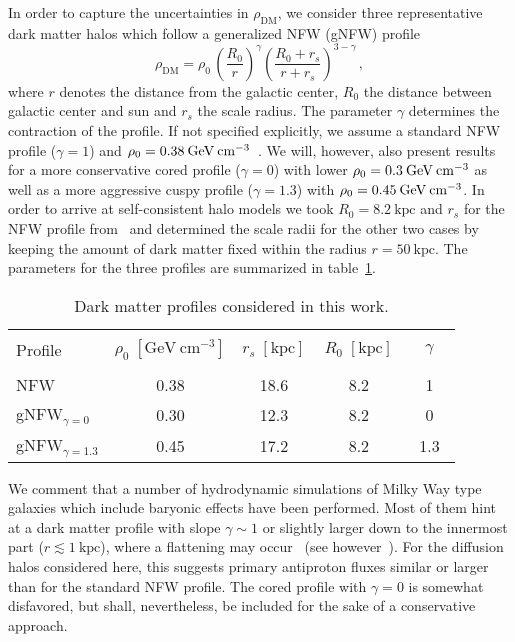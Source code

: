 \documentclass[a4paper,11pt]{article}
\newcommand{\eVdist}{\kern-0.06em}
\newcommand{\gev}{\:\text{Ge\eVdist V}}
\newcommand{\kpc}{\:\text{kpc}}
\newcommand{\cm}{\:\text{cm}}
\begin{document}
In order to capture the uncertainties in $\rho_{\text{DM}}$, we consider three representative dark matter halos which follow a generalized NFW (gNFW) profile
\begin{equation}
  \rho_{\text{DM}} = \rho_0\, \left(\frac{R_0}{r}\right)^\gamma \left(\frac{R_0 +r_s}{r+r_s}\right)^{3-\gamma}\,,
\end{equation}
where $r$ denotes the distance from the galactic center, $R_0$ the distance between galactic center and sun and $r_s$ the scale radius. The parameter $\gamma$ determines the contraction of the profile. 
If not specified explicitly, we assume a standard NFW profile ($\gamma=1$) and $\rho_0=0.38\gev\cm^{-3}$~\cite{McMillan:2016}. We will, however, also present results for a more conservative cored profile ($\gamma=0$) with lower $\rho_0=0.3\gev\cm^{-3}$ as well as a more aggressive cuspy profile ($\gamma=1.3$) with $\rho_0=0.45\gev\cm^{-3}$. In order to arrive at self-consistent halo models we took $R_0=8.2\kpc$ and $r_s$ for the NFW profile from~\cite{McMillan:2016} and determined the scale radii for the other two cases by keeping the amount of dark matter fixed within the radius $r=50\kpc$. The parameters for the three profiles are summarized in table~\ref{tab:profiles}.

\begin{table}[htp]
\begin{center}
\begin{tabular}{|l|cccc|}
\hline
\rowcolor{light-gray}  &   &  &&   \\[-3mm]
\rowcolor{light-gray}  Profile & $\rho_0\;[\text{GeV}\cm^{-3}]$ & $r_s\;[\text{kpc}]$ & $\,R_0\;[\text{kpc}]\,$ & $\;\;\;\gamma\;\;\;$  \\[2mm]
\hline 
  &   & && \\[-3mm]
NFW & 0.38 & 18.6 & 8.2& 1  \\[2mm]
gNFW$_{\gamma=0}$ & 0.30 & 12.3 & 8.2 & 0  \\[2mm]
gNFW$_{\gamma=1.3}$ & 0.45 & 17.2 & 8.2 & 1.3  \\[2mm]
 \hline
\end{tabular}
\end{center}
\caption{Dark matter profiles considered in this work.}
\label{tab:profiles}
\end{table}

We comment that a number of hydrodynamic simulations of Milky Way type galaxies which include baryonic effects have been performed. Most of them hint at a dark matter profile with slope $\gamma \sim 1$ or slightly larger down to the innermost part ($r\lesssim 1\kpc$), where a flattening may occur~\cite{Guedes:2011ux,Roca-Fabrega:2015gma,Zhu:2015jwa,Schaller:2015mua} (see however~\cite{Mollitor:2014ara}). For the diffusion halos considered here, this suggests primary antiproton fluxes similar or larger than for the standard NFW profile. The cored profile with $\gamma=0$ is somewhat disfavored, but shall, nevertheless, be included for the sake of a conservative approach.
\end{document}
